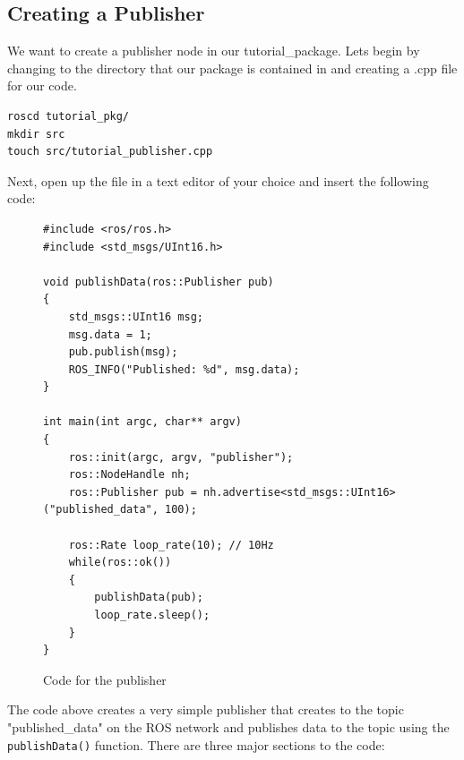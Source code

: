 \documentclass[11pt, twoside, pdftex]{article}
\begin{document}
\subsection{Creating a Publisher}
We want to create a publisher node in our {\sf tutorial\_package}. Lets begin by changing to the directory that our package is contained in and creating a .cpp file for our code.
\begin{lstlisting}
roscd tutorial_pkg/
mkdir src
touch src/tutorial_publisher.cpp
\end{lstlisting}
Next, open up the file in a text editor of your choice and insert the following code:
\begin{figure}[H]
\begin{lstlisting}
#include <ros/ros.h>
#include <std_msgs/UInt16.h>

void publishData(ros::Publisher pub)
{
	std_msgs::UInt16 msg;
	msg.data = 1;
	pub.publish(msg);
	ROS_INFO("Published: %d", msg.data);
}

int main(int argc, char** argv)
{
	ros::init(argc, argv, "publisher");
	ros::NodeHandle nh;
	ros::Publisher pub = nh.advertise<std_msgs::UInt16>("published_data", 100);
	
	ros::Rate loop_rate(10); // 10Hz
	while(ros::ok())
	{
		publishData(pub);
		loop_rate.sleep();
	}
}
\end{lstlisting}
\caption{Code for the publisher}
\end{figure}
The code above creates a very simple publisher that creates to the topic "published\_data" on the ROS network and publishes data to the topic using the \lstinline|publishData()| function. There are three major sections to the code:
\end{document}
